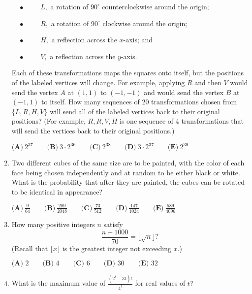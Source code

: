 \documentclass{article}
\begin{document}
\begin{enumerate}[label=\arabic*., itemsep=0.5em]
\(\quad\bullet\qquad\) \(L,\) a rotation of \(90^{\circ}\) counterclockwise around the origin;

\(\quad\bullet\qquad\) \(R,\) a rotation of \(90^{\circ}\) clockwise around the origin;

\(\quad\bullet\qquad\) \(H,\) a reflection across the \(x\)-axis; and

\(\quad\bullet\qquad\) \(V,\) a reflection across the \(y\)-axis.

Each of these transformations maps the squares onto itself, but the positions of the labeled vertices will change. For example, applying \(R\) and then \(V\) would send the vertex \(A\) at \((1,1)\) to \((-1,-1)\) and would send the vertex \(B\) at \((-1,1)\) to itself. How many sequences of \(20\) transformations chosen from \(\{L, R, H, V\}\) will send all of the labeled vertices back to their original positions? (For example, \(R, R, V, H\) is one sequence of \(4\) transformations that will send the vertices back to their original positions.)

\(\textbf{(A)}\ 2^{37} \qquad\textbf{(B)}\ 3\cdot 2^{36} \qquad\textbf{(C)}\  2^{38} \qquad\textbf{(D)}\ 3\cdot 2^{37} \qquad\textbf{(E)}\ 2^{39}\)\par \vspace{0.5em}\item Two different cubes of the same size are to be painted, with the color of each face being chosen independently and at random to be either black or white. What is the probability that after they are painted, the cubes can be rotated to be identical in appearance?

\(\textbf{(A)}\ \frac{9}{64} \qquad\textbf{(B)}\ \frac{289}{2048} \qquad\textbf{(C)}\  \frac{73}{512} \qquad\textbf{(D)}\ \frac{147}{1024} \qquad\textbf{(E)}\ \frac{589}{4096}\)\par \vspace{0.5em}\item How many positive integers \(n\) satisfy
\begin{equation*}
\frac{n+1000}{70} = \lfloor \sqrt{n} \rfloor?
\end{equation*}
(Recall that \(\lfloor x\rfloor\) is the greatest integer not exceeding \(x\).)

\(\textbf{(A) } 2 \qquad\textbf{(B) } 4 \qquad\textbf{(C) } 6 \qquad\textbf{(D) } 30 \qquad\textbf{(E) } 32\)\par \vspace{0.5em}\item What is the maximum value of \(\frac{(2^t-3t)t}{4^t}\) for real values of \(t?\)


\end{enumerate}
\end{document}
